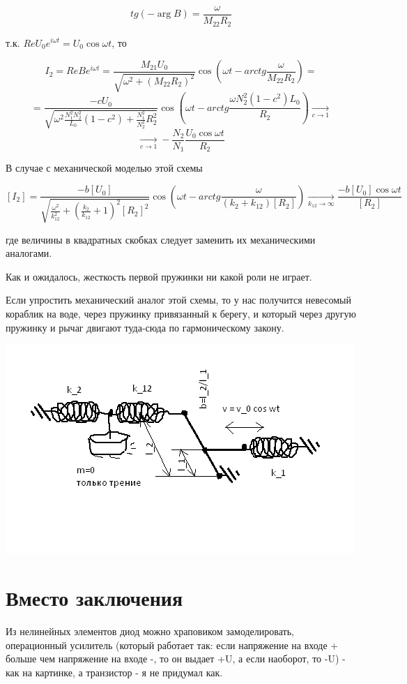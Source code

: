 \documentclass[11pt]{article} %
\begin{document}
$$tg (-\arg B) = \frac{\omega}{M_{22}R_2}$$

т.к. $Re U_0e^{i\omega t}=U_0 \cos \omega t$, то 

$$I_2=ReBe^{i\omega t}=
\frac{M_{21}U_0}{\sqrt{\omega^2+(M_{22}R_2)^2}}
\cos(\omega t-arctg \frac{\omega}{M_{22}R_2})=$$
$$=\frac{-cU_0}{\sqrt{\omega^2\frac{N_1^2N_2^2}{L_0}(1-c^2)+\frac{N_1^2}{N_2^2}R_2^2}}\cos(\omega t-arctg\frac{\omega N_2^2(1-c^2)L_0}{R_2})\xrightarrow[c\to 1]{}$$
$$\xrightarrow[c\to 1]{} -\frac{N_2}{N_1}\frac{U_0\cos \omega t}{R_2}$$

В случае с механической моделью этой схемы 

$$[I_2]=\frac{-b[U_0]}{\sqrt{\frac{\omega^2}{k_{12}^2}+(\frac{k_2}{k_{12}}+1)^2[R_2]^2}}\cos(\omega t-arctg\frac{\omega}{(k_2+k_{12})[R_2]})\xrightarrow[k_{12}\to \infty]{} \frac{-b[U_0]\cos \omega t}{[R_2]}$$

где величины в квадратных скобках следует заменить их механическими аналогами.

Как и ожидалось, жесткость первой пружинки ни какой роли не играет.

Если упростить механический аналог этой схемы, то у нас получится невесомый кораблик на воде, через пружинку привязанный к берегу, и который через другую пружинку и рычаг двигают туда-сюда по гармоническому закону.

\includegraphics{../T_work.png}

\section{Вместо заключения}
Из нелинейных элементов диод можно храповиком замоделировать, операционный усилитель (который работает так: если напряжение на входе + больше чем напряжение на входе -, то он выдает +U, а если наоборот, то -U) - как на картинке, а транзистор - я не придумал как.
\end{document}
